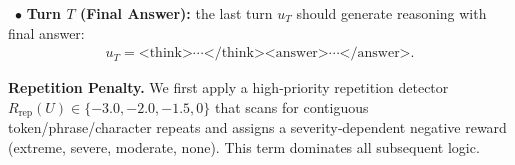 \noindent~$\bullet$ \textbf{Turn $T$ (Final Answer):} the last turn $u_T$ should generate reasoning with final answer:
\begin{equation*}
    \begin{aligned}
u_T=\text{<think>}\cdots\text{</think>}\text{<answer>}\cdots\text{</answer>}.
    \end{aligned}
\end{equation*}


\noindent\textbf{Repetition Penalty.}
We first apply a high‑priority repetition detector $R_{\text{rep}}(U)\!\in\!\{-3.0,-2.0,-1.5,0\}$ that scans for contiguous token/phrase/character repeats and assigns a severity‑dependent negative reward (extreme, severe, moderate, none). This term dominates all subsequent logic. 


